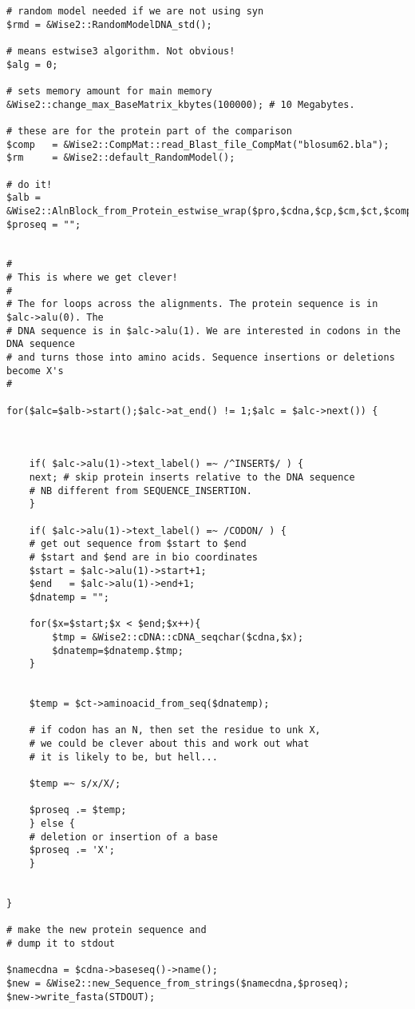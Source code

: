 \documentclass{article}
\begin{document}
\begin{verbatim}
# random model needed if we are not using syn
$rmd = &Wise2::RandomModelDNA_std();

# means estwise3 algorithm. Not obvious!
$alg = 0;

# sets memory amount for main memory
&Wise2::change_max_BaseMatrix_kbytes(100000); # 10 Megabytes.

# these are for the protein part of the comparison
$comp   = &Wise2::CompMat::read_Blast_file_CompMat("blosum62.bla");
$rm     = &Wise2::default_RandomModel();

# do it!
$alb = &Wise2::AlnBlock_from_Protein_estwise_wrap($pro,$cdna,$cp,$cm,$ct,$comp,-12,-2,0,$rmd,$alg,$rm,1);
$proseq = "";


#
# This is where we get clever!
#
# The for loops across the alignments. The protein sequence is in $alc->alu(0). The
# DNA sequence is in $alc->alu(1). We are interested in codons in the DNA sequence
# and turns those into amino acids. Sequence insertions or deletions become X's
#

for($alc=$alb->start();$alc->at_end() != 1;$alc = $alc->next()) {
    


    if( $alc->alu(1)->text_label() =~ /^INSERT$/ ) {
	next; # skip protein inserts relative to the DNA sequence
	# NB different from SEQUENCE_INSERTION.
    }

    if( $alc->alu(1)->text_label() =~ /CODON/ ) {	
	# get out sequence from $start to $end
	# $start and $end are in bio coordinates
	$start = $alc->alu(1)->start+1; 
	$end   = $alc->alu(1)->end+1;                
	$dnatemp = "";

	for($x=$start;$x < $end;$x++){
	    $tmp = &Wise2::cDNA::cDNA_seqchar($cdna,$x);
	    $dnatemp=$dnatemp.$tmp;
	}	

	
	$temp = $ct->aminoacid_from_seq($dnatemp);

	# if codon has an N, then set the residue to unk X,
	# we could be clever about this and work out what 
	# it is likely to be, but hell...

	$temp =~ s/x/X/;

	$proseq .= $temp;
    } else {
	# deletion or insertion of a base
	$proseq .= 'X';
    }

    
}

# make the new protein sequence and 
# dump it to stdout

$namecdna = $cdna->baseseq()->name();
$new = &Wise2::new_Sequence_from_strings($namecdna,$proseq);
$new->write_fasta(STDOUT);


\end{verbatim}
\end{document}
